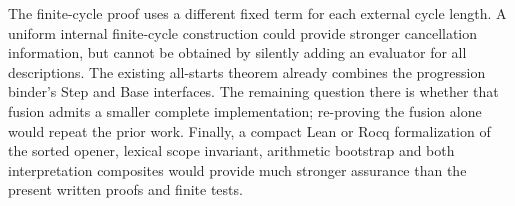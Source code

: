 The finite-cycle proof uses a different fixed term for each external
cycle length. A uniform internal finite-cycle construction could provide
stronger cancellation information, but cannot be obtained by silently
adding an evaluator for all descriptions. The existing all-starts theorem
already combines the progression binder's Step and Base interfaces. The
remaining question there is whether that fusion admits a smaller complete
implementation; re-proving the fusion alone would repeat the prior work.
Finally, a compact Lean or Rocq formalization of the sorted opener,
lexical scope invariant, arithmetic bootstrap and both interpretation
composites would provide much stronger assurance than the present
written proofs and finite tests.
